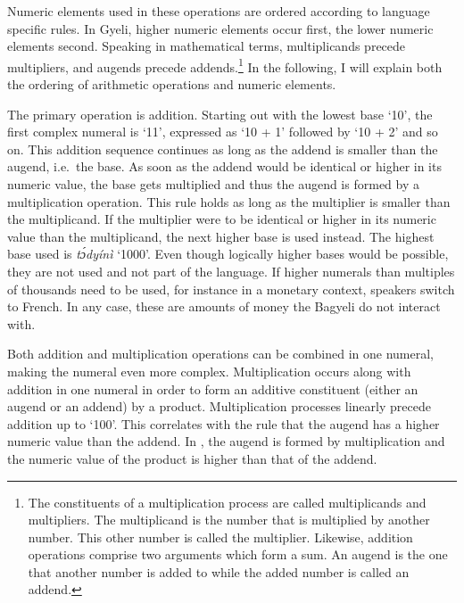 Numeric elements used in these operations are ordered according to language specific rules. In Gyeli, higher numeric elements occur first, the lower numeric elements second. Speaking in mathematical terms, multiplicands precede multipliers, and augends precede addends.\footnote{The constituents of a multiplication process are called multiplicands and multipliers. The multiplicand is the number that is multiplied by another number. This other number is called the multiplier. Likewise, addition operations comprise two arguments which form a sum. An augend is the one that another number is added to while the added number is called an addend.} In the following, I will explain both the ordering of arithmetic operations and numeric elements.

The primary operation is addition. Starting out with the lowest base `10', the first complex numeral is `11', expressed as `10 + 1' followed by `10 + 2' and so on. This addition sequence continues as long as the addend is smaller than the augend, i.e.~the base. As soon as the addend would be identical or higher in its numeric value, the base gets multiplied and thus the augend is formed by a multiplication operation. This rule holds as long as the multiplier is smaller than the multiplicand. If the multiplier were to be identical or higher in its numeric value than the multiplicand, the next higher base is used instead. The highest base used is {\itshape tɔ́dyínì} `1000'. Even though logically higher bases would be possible, they are not used and not part of the language. If higher numerals than multiples of thousands need to be used, for instance in a monetary context, speakers switch to French. In any case, these are amounts of money the Bagyeli do not interact with.

Both addition and multiplication operations can be combined in one numeral, making the numeral even more complex. Multiplication occurs along with addition in one numeral in order to form an additive constituent (either an augend or an addend) by a product. Multiplication processes linearly precede addition up to `100'. This correlates with the rule that the augend has a higher numeric value than the addend. In , the augend is formed by multiplication and the numeric value of the product is higher than that of the addend.

